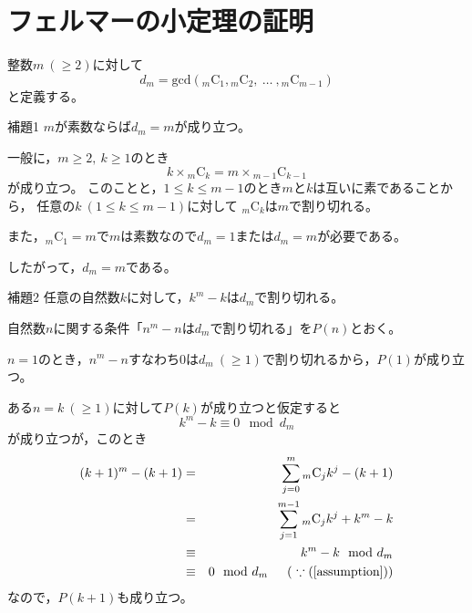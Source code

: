 \documentclass{article}
\newcommand{\combination}[2]{{}_{#1} \mathrm{C}_{#2}}
\begin{document}
\section{フェルマーの小定理の証明}

整数$m\ (\geq 2)$に対して
\begin{equation*}
    d_m = \mathrm{gcd} (\combination{m}{1}, \combination{m}{2},\ \ldots\ , \combination{m}{m-1})
\end{equation*}
と定義する。

\begin{itembox}[l]{補題1}
    $m$が素数ならば$d_m = m$が成り立つ。
\end{itembox}

一般に，$m \geq 2,\ k \geq 1$のとき
\begin{equation*}
    k \times \combination{m}{k} = m \times \combination{m - 1}{k - 1}
\end{equation*}
が成り立つ。
このことと，$1 \leq k \leq m - 1$のとき$m$と$k$は互いに素であることから，
任意の$k\ (1 \leq k \leq m - 1)$に対して
$\combination{m}{k}$は$m$で割り切れる。

また，$\combination{m}{1} = m$で$m$は素数なので$d_m = 1$または$d_m = m$が必要である。

したがって，$d_m = m$である。

\begin{itembox}[l]{補題2}
    任意の自然数$k$に対して，$k^m - k$は$d_m$で割り切れる。
\end{itembox}

自然数$n$に関する条件「$n^m - n$は$d_m$で割り切れる」を$P(n)$とおく。

$n = 1$のとき，$n^m - n$すなわち0は$d_m\ (\geq 1)$で割り切れるから，$P(1)$が成り立つ。

ある$n = k\ (\geq 1)$に対して$P(k)$が成り立つと仮定すると
\begin{equation}
    \label{assumption}
    k^m - k \equiv 0 \mod{d_m}
\end{equation}
が成り立つが，このとき
\begin{eqnarray*}
    (k + 1)^m - (k + 1) &=& \sum_{j = 0}^{m} \combination{m}{j} k^j - (k + 1) \\
                        &=& \sum_{j = 1}^{m - 1} \combination{m}{j} k^j + k^m - k \\
                        &\equiv& k^m - k \mod{d_m} \\
                        &\equiv& 0 \mod{d_m} \hspace{15pt} (\ \because (\ref{assumption}) )
\end{eqnarray*}
なので，$P(k + 1)$も成り立つ。
\end{document}
